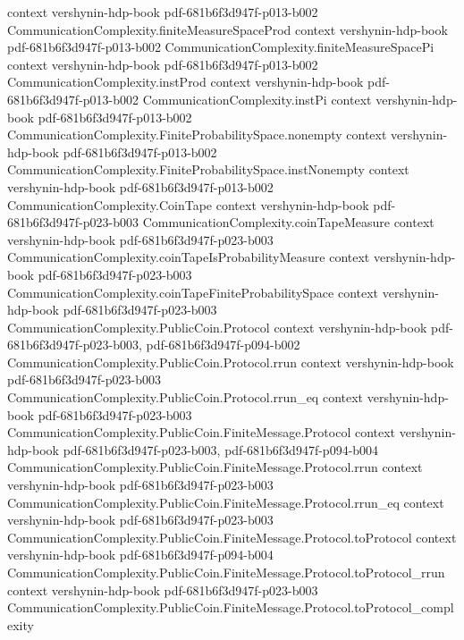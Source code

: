 \begin{theorem}
  {context}
  {vershynin-hdp-book}
  {pdf-681b6f3d947f-p013-b002}
\proofstep
  {CommunicationComplexity.finiteMeasureSpaceProd}
  {context}
  {vershynin-hdp-book}
  {pdf-681b6f3d947f-p013-b002}
\proofstep
  {CommunicationComplexity.finiteMeasureSpacePi}
  {context}
  {vershynin-hdp-book}
  {pdf-681b6f3d947f-p013-b002}
\proofstep
  {CommunicationComplexity.instProd}
  {context}
  {vershynin-hdp-book}
  {pdf-681b6f3d947f-p013-b002}
\proofstep
  {CommunicationComplexity.instPi}
  {context}
  {vershynin-hdp-book}
  {pdf-681b6f3d947f-p013-b002}
\proofstep
  {CommunicationComplexity.FiniteProbabilitySpace.nonempty}
  {context}
  {vershynin-hdp-book}
  {pdf-681b6f3d947f-p013-b002}
\proofstep
  {CommunicationComplexity.FiniteProbabilitySpace.instNonempty}
  {context}
  {vershynin-hdp-book}
  {pdf-681b6f3d947f-p013-b002}
\proofstep
  {CommunicationComplexity.CoinTape}
  {context}
  {vershynin-hdp-book}
  {pdf-681b6f3d947f-p023-b003}
\proofstep
  {CommunicationComplexity.coinTapeMeasure}
  {context}
  {vershynin-hdp-book}
  {pdf-681b6f3d947f-p023-b003}
\proofstep
  {CommunicationComplexity.coinTapeIsProbabilityMeasure}
  {context}
  {vershynin-hdp-book}
  {pdf-681b6f3d947f-p023-b003}
\proofstep
  {CommunicationComplexity.coinTapeFiniteProbabilitySpace}
  {context}
  {vershynin-hdp-book}
  {pdf-681b6f3d947f-p023-b003}
\proofstep
  {CommunicationComplexity.PublicCoin.Protocol}
  {context}
  {vershynin-hdp-book}
  {pdf-681b6f3d947f-p023-b003,
    pdf-681b6f3d947f-p094-b002}
\proofstep
  {CommunicationComplexity.PublicCoin.Protocol.rrun}
  {context}
  {vershynin-hdp-book}
  {pdf-681b6f3d947f-p023-b003}
\proofstep
  {CommunicationComplexity.PublicCoin.Protocol.rrun_eq}
  {context}
  {vershynin-hdp-book}
  {pdf-681b6f3d947f-p023-b003}
\proofstep
  {CommunicationComplexity.PublicCoin.FiniteMessage.Protocol}
  {context}
  {vershynin-hdp-book}
  {pdf-681b6f3d947f-p023-b003,
    pdf-681b6f3d947f-p094-b004}
\proofstep
  {CommunicationComplexity.PublicCoin.FiniteMessage.Protocol.rrun}
  {context}
  {vershynin-hdp-book}
  {pdf-681b6f3d947f-p023-b003}
\proofstep
  {CommunicationComplexity.PublicCoin.FiniteMessage.Protocol.rrun_eq}
  {context}
  {vershynin-hdp-book}
  {pdf-681b6f3d947f-p023-b003}
\proofstep
  {CommunicationComplexity.PublicCoin.FiniteMessage.Protocol.toProtocol}
  {context}
  {vershynin-hdp-book}
  {pdf-681b6f3d947f-p094-b004}
\proofstep
  {CommunicationComplexity.PublicCoin.FiniteMessage.Protocol.toProtocol_rrun}
  {context}
  {vershynin-hdp-book}
  {pdf-681b6f3d947f-p023-b003}
\proofstep
  {CommunicationComplexity.PublicCoin.FiniteMessage.Protocol.toProtocol_complexity}

\end{theorem}

